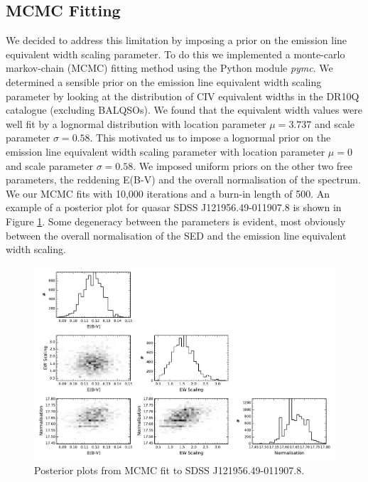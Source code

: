 \subsection{MCMC Fitting}

We decided to address this limitation by imposing a prior on the emission line equivalent width scaling parameter. To do this we implemented a monte-carlo markov-chain (MCMC) fitting method using the Python module {\it pymc}. We determined a sensible prior on the emission line equivalent width scaling parameter by looking at the distribution of CIV equivalent widths in the DR10Q catalogue (excluding BALQSOs). We found that the equivalent width values were well fit by a lognormal distribution with location parameter $\mu = 3.737$ and scale parameter $\sigma = 0.58$. This motivated us to impose a lognormal prior on the emission line equivalent width scaling parameter with location parameter $\mu = 0$ and scale parameter $\sigma = 0.58$. We imposed uniform priors on the other two free parameters, the reddening E(B-V) and the overall normalisation of the spectrum. We our MCMC fits with 10,000 iterations and a burn-in length of 500. An example of a posterior plot for quasar SDSS J121956.49-011907.8 is shown in Figure \ref{fig:posteriorplot}. Some degeneracy between the parameters is evident, most obviously between the overall normalisation of the SED and the emission line equivalent width scaling. 

\begin{figure}
  \centering
  \includegraphics[width=\textwidth]{figures/chapter06/posteriorplot}
  \caption{Posterior plots from MCMC fit to SDSS J121956.49-011907.8.}
  \label{fig:posteriorplot}
\end{figure}

